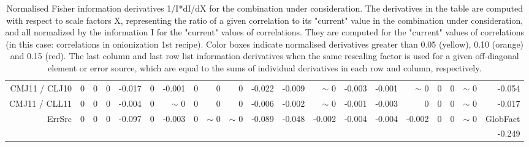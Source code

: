 \begin{table}[H]
\begin{center}
\begin{tabular}{|r|rrrrrrrrrrrrrrrrrr|r|}
CMJ11 / CLJ10 &  0 &  0 &  0 &     -0.017 &  0 &     -0.001 &  0 &  0 &  0 &     -0.022 &     -0.009 &  {\tiny $\sim$ }0 &     -0.003 &     -0.001 &  {\tiny $\sim$ }0 &  0 &  0 &  {\tiny $\sim$ }0 &     -0.054 \\
CMJ11 / CLL11 &  0 &  0 &  0 &     -0.004 &  0 &  {\tiny $\sim$ }0 &  0 &  0 &  0 &     -0.006 &     -0.002 &  {\tiny $\sim$ }0 &     -0.001 &     -0.003 &  0 &  0 &  0 &  {\tiny $\sim$ }0 &     -0.017 \\
\hline
\multirow{2}{*}{ErrSrc} & \multirow{2}{*}{ 0} & \multirow{2}{*}{ 0} & \multirow{2}{*}{ 0} & \multirow{2}{*}{    -0.097} & \multirow{2}{*}{ 0} & \multirow{2}{*}{    -0.003} & \multirow{2}{*}{ 0} & \multirow{2}{*}{ {\tiny $\sim$ }0} & \multirow{2}{*}{ {\tiny $\sim$ }0} & \multirow{2}{*}{    -0.089} & \multirow{2}{*}{    -0.048} & \multirow{2}{*}{    -0.002} & \multirow{2}{*}{    -0.004} & \multirow{2}{*}{    -0.004} & \multirow{2}{*}{    -0.002} & \multirow{2}{*}{ 0} & \multirow{2}{*}{ 0} & \multirow{2}{*}{ {\tiny $\sim$ }0} & GlobFact\\
 & & & & & & & & & & & & & & & & & & &     -0.249 \\
\hline
\end{tabular}
\renewcommand{\arraystretch}{1}
\caption{Normalised Fisher information derivatives 1/I*dI/dX for the combination under consideration. The derivatives in the table are computed with respect to scale factors X, representing the ratio of a given correlation to its "current" value in the combination under consideration, and all normalized by the information I for the "current" values of correlations. They are computed for the "current" values of correlations (in this case: correlations in onionization 1st recipe). Color boxes indicate normalised derivatives greater than 0.05 (yellow), 0.10 (orange) and 0.15 (red). The last column and last row list information derivatives when the same rescaling factor is used for a given off-diagonal element or error source, which are equal to the sums of individual derivatives in each row and column, respectively.}
\end{center}
\end{table}
